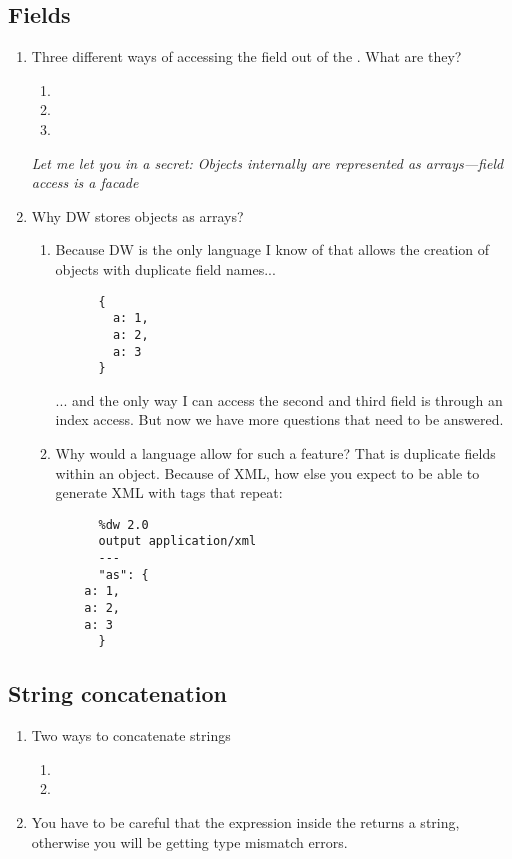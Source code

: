 \subsection{Fields}
\begin{enumerate}[resume*]
\item Three different ways of accessing the field 
  out of the . What are they?
  \begin{enumerate}
  \item {}
  \item {}
  \item {}
  \end{enumerate}
  \emph{Let me let you in a secret: Objects internally are represented as arrays—field access is a facade}
\item Why DW stores objects as arrays?
  \begin{enumerate}
  \item Because DW is the only language I know of that allows the creation of objects with
    duplicate field names...
    \begin{lstlisting}
      {
        a: 1,
        a: 2,
        a: 3
      }
    \end{lstlisting}
    ... and the only way I can access the second and third field is through an index access.
    But now we have more questions that need to be answered.
  \item Why would a language allow for such a feature?  That is duplicate fields within an object.
    Because of XML, how else you expect to be able to generate XML with tags that repeat:
    \begin{lstlisting}
      %dw 2.0
      output application/xml
      ---
      "as": {
	a: 1,
	a: 2,
	a: 3
      }        
    \end{lstlisting}
  \end{enumerate}
\end{enumerate}

\subsection{String concatenation}
\begin{enumerate}[resume*]
\item Two ways to concatenate strings
  \begin{enumerate}
  \item {}
  \item {}
  \end{enumerate}
\item You have to be careful that the expression inside the \ttt{\$\{\}} returns
  a string, otherwise you will be getting type mismatch errors.
\end{enumerate}

